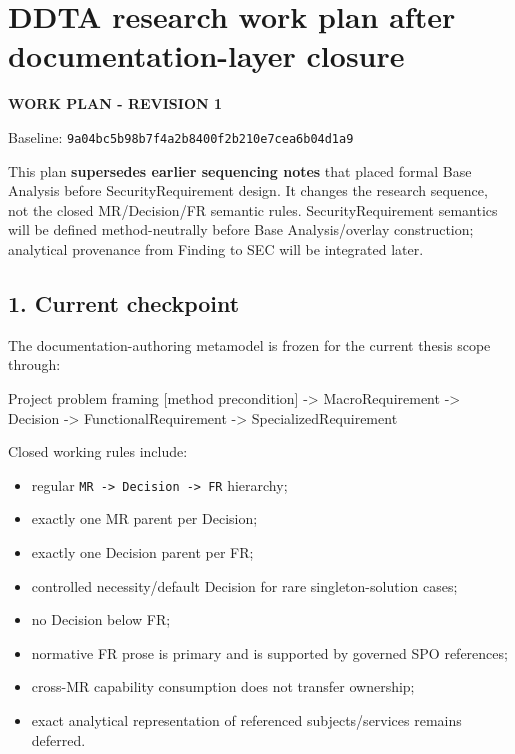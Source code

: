 \documentclass[
  11pt,
  a4paper,
]{article}
\author{}
\date{}
\newenvironment{Shaded}{}{}
\newcommand{\NormalTok}[1]{#1}
\providecommand{\tightlist}{%
  \setlength{\itemsep}{0pt}\setlength{\parskip}{0pt}}
\begin{document}
\section{DDTA research work plan after documentation-layer
closure}\label{ddta-research-work-plan-after-documentation-layer-closure}

\textbf{WORK PLAN - REVISION 1}

Baseline: \texttt{9a04bc5b98b7f4a2b8400f2b210e7cea6b04d1a9}

This plan \textbf{supersedes earlier sequencing notes} that placed
formal Base Analysis before SecurityRequirement design. It changes the
research sequence, not the closed MR/Decision/FR semantic rules.
SecurityRequirement semantics will be defined method-neutrally before
Base Analysis/overlay construction; analytical provenance from Finding
to SEC will be integrated later.

\subsection{1. Current checkpoint}\label{current-checkpoint}

The documentation-authoring metamodel is frozen for the current thesis
scope through:

\begin{Shaded}
\begin{Highlighting}[]
\NormalTok{Project problem framing [method precondition]}
\NormalTok{        {-}\textgreater{} MacroRequirement}
\NormalTok{        {-}\textgreater{} Decision}
\NormalTok{        {-}\textgreater{} FunctionalRequirement}
\NormalTok{        {-}\textgreater{} SpecializedRequirement}
\end{Highlighting}
\end{Shaded}

Closed working rules include:

\begin{itemize}
\tightlist
\item
  regular \texttt{MR\ -\textgreater{}\ Decision\ -\textgreater{}\ FR}
  hierarchy;
\item
  exactly one MR parent per Decision;
\item
  exactly one Decision parent per FR;
\item
  controlled necessity/default Decision for rare singleton-solution
  cases;
\item
  no Decision below FR;
\item
  normative FR prose is primary and is supported by governed SPO
  references;
\item
  cross-MR capability consumption does not transfer ownership;
\item
  exact analytical representation of referenced subjects/services
  remains deferred.
\end{itemize}
\end{document}

